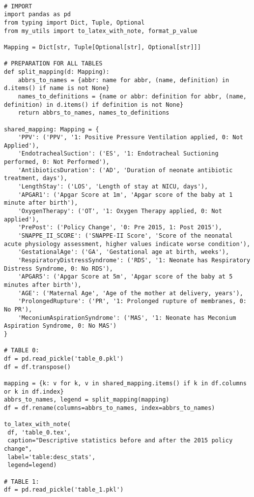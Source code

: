 \documentclass[11pt]{article}
\begin{document}
\begin{verbatim}

# IMPORT
import pandas as pd
from typing import Dict, Tuple, Optional
from my_utils import to_latex_with_note, format_p_value

Mapping = Dict[str, Tuple[Optional[str], Optional[str]]]

# PREPARATION FOR ALL TABLES
def split_mapping(d: Mapping):
    abbrs_to_names = {abbr: name for abbr, (name, definition) in d.items() if name is not None}
    names_to_definitions = {name or abbr: definition for abbr, (name, definition) in d.items() if definition is not None}
    return abbrs_to_names, names_to_definitions

shared_mapping: Mapping = {
    'PPV': ('PPV', '1: Positive Pressure Ventilation applied, 0: Not Applied'),
    'EndotrachealSuction': ('ES', '1: Endotracheal Suctioning performed, 0: Not Performed'),
    'AntibioticsDuration': ('AD', 'Duration of neonate antibiotic treatment, days'),
    'LengthStay': ('LOS', 'Length of stay at NICU, days'),
    'APGAR1': ('Apgar Score at 1m', 'Apgar score of the baby at 1 minute after birth'),
    'OxygenTherapy': ('OT', '1: Oxygen Therapy applied, 0: Not applied'),
    'PrePost': ('Policy Change', '0: Pre 2015, 1: Post 2015'),
    'SNAPPE_II_SCORE': ('SNAPPE-II Score', 'Score of the neonatal acute physiology assessment, higher values indicate worse condition'),
    'GestationalAge': ('GA', 'Gestational age at birth, weeks'),
    'RespiratoryDistressSyndrome': ('RDS', '1: Neonate has Respiratory Distress Syndrome, 0: No RDS'),
    'APGAR5': ('Apgar Score at 5m', 'Apgar score of the baby at 5 minutes after birth'),
    'AGE': ('Maternal Age', 'Age of the mother at delivery, years'),
    'ProlongedRupture': ('PR', '1: Prolonged rupture of membranes, 0: No PR'),
    'MeconiumAspirationSyndrome': ('MAS', '1: Neonate has Meconium Aspiration Syndrome, 0: No MAS')
}

# TABLE 0:
df = pd.read_pickle('table_0.pkl')
df = df.transpose() 

mapping = {k: v for k, v in shared_mapping.items() if k in df.columns or k in df.index}
abbrs_to_names, legend = split_mapping(mapping)
df = df.rename(columns=abbrs_to_names, index=abbrs_to_names)

to_latex_with_note(
 df, 'table_0.tex',
 caption="Descriptive statistics before and after the 2015 policy change", 
 label='table:desc_stats',
 legend=legend)

# TABLE 1:
df = pd.read_pickle('table_1.pkl')


\end{verbatim}
\end{document}
